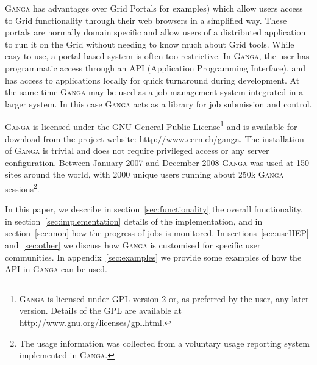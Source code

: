 \documentclass{elsart}
\def\ganga {\textsc{Ganga}\xspace}
\def\grid {Grid\xspace}
\begin{document}
\ganga has advantages over \grid Portals \cite{thomas_2005,li_2006} for
examples) which allow users access to \grid functionality through
their web browsers in a simplified way. These portals are normally
domain specific and allow users of a distributed application to run it
on the \grid without needing to know much about \grid tools. While
easy to use, a portal-based system is often too restrictive.  In
\ganga, the user has programmatic access through an API (Application
Programming Interface), and has access to applications locally for
quick turnaround during development. At the same time \ganga may be
used as a job management system integrated in a larger system. In this
case \ganga acts as a library for job submission and control.

\ganga is licensed under the GNU General Public
License\footnote{\ganga is licensed under GPL version 2 or, as preferred by
the user, any later version.  Details of the GPL are available at
\url{http://www.gnu.org/licenses/gpl.html}.} and is available for download from
the project website: \url{http://www.cern.ch/ganga}. The installation of \ganga is trivial and
does not require privileged access or any server configuration. 
Between January 2007 and December 2008 \ganga was
used at 150 sites around the world, with 2000 unique users running about 250k %
\ganga sessions\footnote{The usage information was collected from a voluntary
  usage reporting system implemented in \ganga.}.

In this paper, we describe in section~\ref{sec:functionality} the overall
functionality, in section~\ref{sec:implementation} details of the
implementation, and in section~\ref{sec:mon} how the progress of jobs is
monitored. In sections~\ref{sec:useHEP} and~\ref{sec:other} we discuss how
\ganga is customised for specific user communities. In
appendix~\ref{sec:examples} we provide some examples of how the API in \ganga
can be used.
\end{document}
